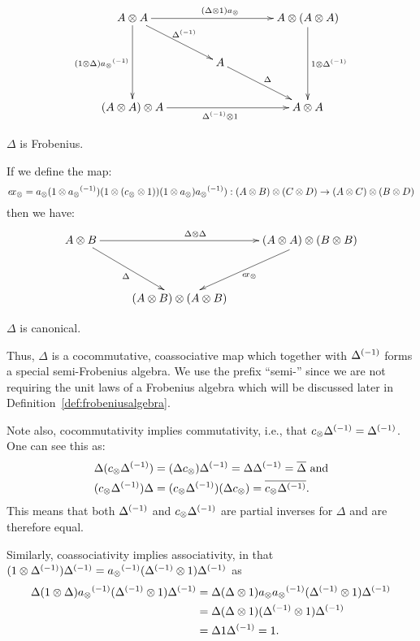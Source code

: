 \begin{definition}
  \[
    \xymatrix @C=40pt @R=25pt{
      A \* A \ar[dd]_{(1\*\Delta) \inv{a_{\*}}} \ar[dr]^{\inv{\Delta}}
      \ar[rr]^{(\Delta \* 1) a_{\*}} & &
      A \* (A \* A) \ar[dd]^{1 \* \inv{\Delta}}\\
      & A \ar[dr]^{\Delta} & \\
      (A \* A) \* A \ar[rr]_{\inv{\Delta} \* 1} & &
      A \* A
    }
  \]
\begin{center}$\Delta$ is Frobenius.\end{center}
If we define the map:
  \[
    e\!x_{\otimes} =  a_{\otimes}(1\otimes{a_{\otimes}}^{(-1)})(1\otimes(c_{\otimes}\otimes1))(1\otimes a_{\otimes}){a_{\otimes}}^{(-1)}): (A\otimes B)\otimes(C\otimes D) \to (A\otimes C) \otimes (B\otimes D)
  \]
then we have:
  \[
    \xymatrix @C=25pt @R=35pt{
      A \* B \ar[dr]_{\Delta}
      \ar[rr]^{\Delta \* \Delta} && (A \* A) \* (B \* B) \ar[dl]^{\excs}\\
      &(A \* B) \* (A \* B)
    }
  \]
\begin{center}$\Delta$ is canonical.\end{center}

  Thus, $\Delta$ is a cocommutative, coassociative map which together with ${\Delta}^{(-1)}$ forms a
  special semi-Frobenius algebra. We use the prefix ``semi-'' since we are not requiring the unit laws
  of a Frobenius algebra which will be discussed later in Definition~\ref{def:frobeniusalgebra}.
\end{definition}

Note also, cocommutativity implies commutativity, i.e., that $c_{\otimes}{\Delta}^{(-1)} = {\Delta}^{(-1)}$.
One can see this as:
\begin{align*}
  \Delta(c_{\otimes}{\Delta}^{(-1)})
  &= (\Delta c_{\otimes}){\Delta}^{(-1)} = \Delta{\Delta}^{(-1)} = \overline{\Delta} \text{ and}\\
  (c_{\otimes}{\Delta}^{(-1)})\Delta
  & = (c_{\otimes}{\Delta}^{(-1)})(\Delta c_{\otimes}) = \overline{c_{\otimes}{\Delta}^{(-1)}}.
\end{align*}
This means that both ${\Delta}^{(-1)}$ and $c_{\otimes}{\Delta}^{(-1)}$ are partial inverses for $\Delta$
and are therefore equal.

Similarly, coassociativity implies associativity, in that
$(1\otimes{\Delta}^{(-1)}){\Delta}^{(-1)} =  {a_{\otimes}}^{(-1)}({\Delta}^{(-1)}\otimes 1){\Delta}^{(-1)}$ as
\begin{align*}
  \Delta(1\otimes\Delta){a_{\otimes}}^{(-1)}({\Delta}^{(-1)}\otimes 1){\Delta}^{(-1)} &=
  \Delta(\Delta\otimes1)a_{\otimes}{a_{\otimes}}^{(-1)}({\Delta}^{(-1)}\otimes 1){\Delta}^{(-1)} \\
  & =\Delta(\Delta\otimes1)({\Delta}^{(-1)}\otimes 1){\Delta}^{(-1)} \\
  & =\Delta 1{\Delta}^{(-1)} = 1.
\end{align*}

